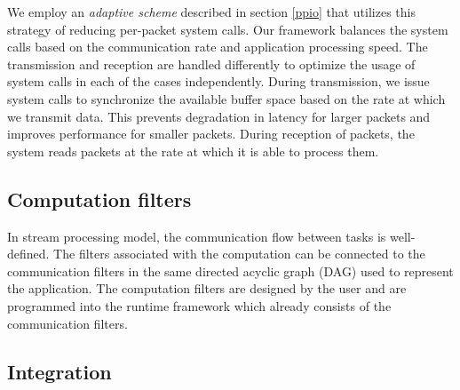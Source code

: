 \documentclass[10pt, conference, compsocconf, reqno]{IEEEtran}
\newcommand{\comment}[1]{}
\begin{document}
We employ an \textit{adaptive scheme} described in section \ref{ppio} that utilizes this strategy of reducing per-packet system calls. Our framework balances the system calls based on the communication rate and application processing speed. The transmission and reception are handled differently to optimize the usage of system calls in each of the cases independently. During transmission, we issue system calls to synchronize the available buffer space based on the rate at which we transmit data. This prevents degradation in latency for larger packets and improves performance for smaller packets. During reception of packets, the system reads packets at the rate at which it is able to process them.

\subsection{Computation filters}

\comment{Computation filters represents the operations associated . The subset of the application that we are interested in parallelizing is the stream processing component.} In stream processing model, the communication flow between tasks is well-defined. \comment{This is usually represented by a synchronous data flow graph (SDF).} The filters associated with the computation can be connected to the communication filters in the same directed acyclic graph (DAG) used to represent the application. \comment{The packet processing tasks operate on packets and the application tasks operate on the data. Since we focus more on parallel packet processing, optimizations in relation to the application graph are not discussed. It is assumed that a static version of the application graph is available and we focus more on executing these tasks in parallel with the packet processing tasks.} The computation filters are designed by the user and are programmed into the runtime framework which already consists of the communication filters.

\subsection{Integration}

\comment{The sequence of tasks that can be executed in parallel is determined at this stage. The integration stage is used to combine the application graph and the packet processing graph into a larger graph that unifies and represents the overall operations. The dependency relations identified earlier are used in establishing links between the graphs. We determine the sequence of tasks that can be executed in parallel from both the application task graph and packet processing graph. The combined set of tasks is then used by the parallel processing engine.}
\end{document}
